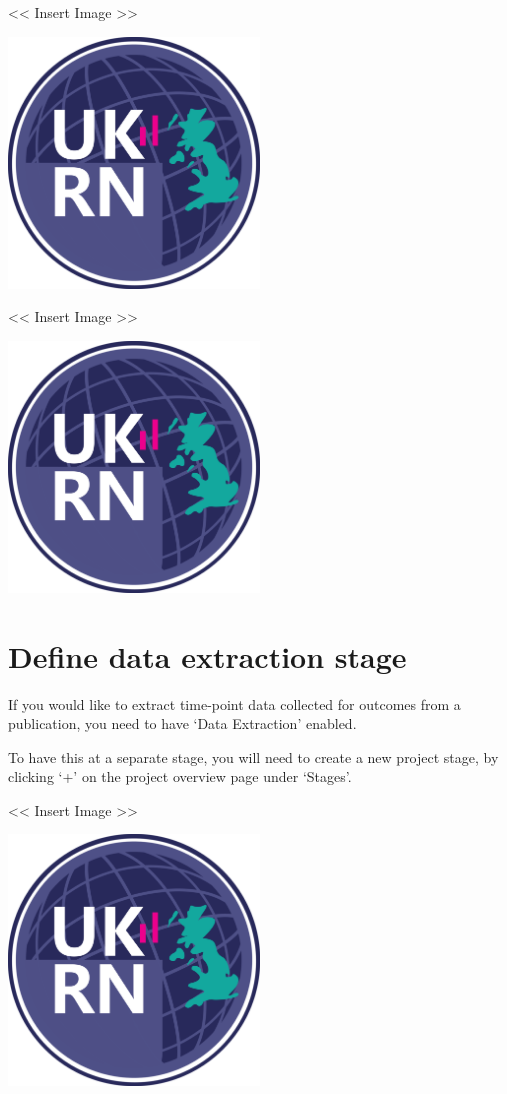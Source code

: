 \documentclass[
]{book}
\begin{document}
\textless{}\textless{} Insert Image \textgreater{}\textgreater{}

\includegraphics[width=0.5\textwidth,height=0.5\textheight]{figs/evidence-triangle.png}

\textless{}\textless{} Insert Image \textgreater{}\textgreater{}

\includegraphics[width=0.5\textwidth,height=0.5\textheight]{figs/evidence-triangle.png}

\hypertarget{define-data-extraction-stage}{%
\section{Define data extraction stage}\label{define-data-extraction-stage}}

If you would like to extract time-point data collected for outcomes from a publication, you need to have `Data Extraction' enabled.

To have this at a separate stage, you will need to create a new project stage, by clicking `+' on the project overview page under `Stages'.

\textless{}\textless{} Insert Image \textgreater{}\textgreater{}

\includegraphics[width=0.5\textwidth,height=0.5\textheight]{figs/evidence-triangle.png}
\end{document}
